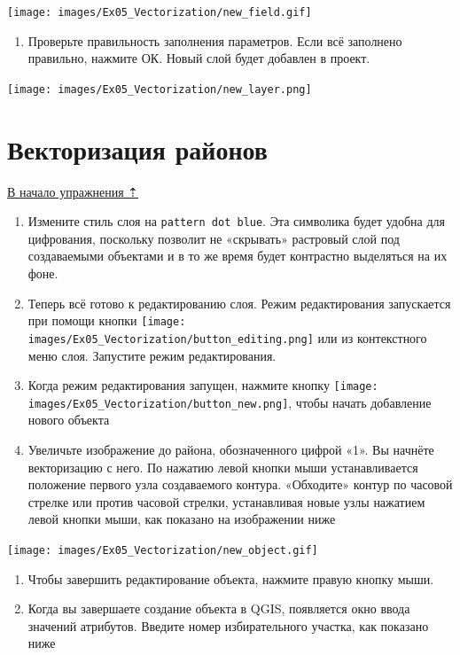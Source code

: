 \documentclass[
  12pt,
]{book}
\providecommand{\tightlist}{%
  \setlength{\itemsep}{0pt}\setlength{\parskip}{0pt}}
\begin{document}
\texttt{[image: images/Ex05\_Vectorization/new\_field.gif]}

\begin{enumerate}
\def\labelenumi{\arabic{enumi}.}
\setcounter{enumi}{3}
\tightlist
\item
  Проверьте правильность заполнения параметров. Если всё заполнено правильно, нажмите ОК. Новый слой будет добавлен в проект.
\end{enumerate}

\texttt{[image: images/Ex05\_Vectorization/new\_layer.png]}

\hypertarget{digitizing-drawing}{%
\section{Векторизация районов}\label{digitizing-drawing}}

\protect\hyperlink{digitizingf-districts}{В начало упражнения ⇡}

\begin{enumerate}
\def\labelenumi{\arabic{enumi}.}
\item
  Измените стиль слоя на \texttt{pattern\ dot\ blue}. Эта символика будет удобна для цифрования, поскольку позволит не «скрывать» растровый слой под создаваемыми объектами и в то же время будет контрастно выделяться на их фоне.
\item
  Теперь всё готово к редактированию слоя. Режим редактирования запускается при помощи кнопки \texttt{[image: images/Ex05\_Vectorization/button\_editing.png]} или из контекстного меню слоя. Запустите режим редактирования.
\item
  Когда режим редактирования запущен, нажмите кнопку \texttt{[image: images/Ex05\_Vectorization/button\_new.png]}, чтобы начать добавление нового объекта
\item
  Увеличьте изображение до района, обозначенного цифрой «1». Вы начнёте векторизацию с него. По нажатию левой кнопки мыши устанавливается положение первого узла создаваемого контура. «Обходите» контур по часовой стрелке или против часовой стрелки, устанавливая новые узлы нажатием левой кнопки мыши, как показано на изображении ниже
\end{enumerate}

\texttt{[image: images/Ex05\_Vectorization/new\_object.gif]}

\begin{enumerate}
\def\labelenumi{\arabic{enumi}.}
\setcounter{enumi}{4}
\item
  Чтобы завершить редактирование объекта, нажмите правую кнопку мыши.
\item
  Когда вы завершаете создание объекта в QGIS, появляется окно ввода значений атрибутов. Введите номер избирательного участка, как показано ниже
\end{enumerate}
\end{document}

